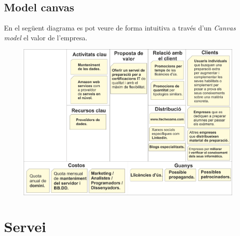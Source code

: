 \documentclass[12pt]{article}
\begin{document}
\subsection{Model canvas}
En el següent diagrama es pot veure de forma intuitiva a través d'un \textit{Canvas model} el valor de l'empresa.
\begin{landscape}
\begin{figure}
	\centering
	\includegraphics[width=1.5\textwidth]{imatges/canvas.png}
\end{figure}
\end{landscape}




\clearpage
\section{Servei}
\end{document}
